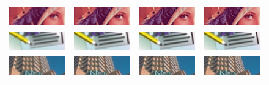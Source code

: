 \documentclass[10pt,twocolumn,letterpaper]{article}
\begin{document}
\begin{figure}
{\begin{tabular}{cccc}
\includegraphics[width=0.075\linewidth]{lennaOx4}&
\includegraphics[width=0.3\linewidth]{lennaZx4}&
\includegraphics[width=0.3\linewidth]{lennaA+x4}&
\includegraphics[width=0.3\linewidth]{lennaIx4}\\
\includegraphics[width=0.075\linewidth]{ppt3O2x4}&
\includegraphics[width=0.3\linewidth]{ppt3Z2x4}&
\includegraphics[width=0.3\linewidth]{ppt3A+2x4}&
\includegraphics[width=0.3\linewidth]{ppt3I2x4}\\
\includegraphics[width=0.1\linewidth]{86000O}&
\includegraphics[width=0.3\linewidth]{86000Z}&
\includegraphics[width=0.3\linewidth]{86000A+}&
\includegraphics[width=0.3\linewidth]{86000I}\\

\end{tabular}}
\end{figure}
\end{document}
